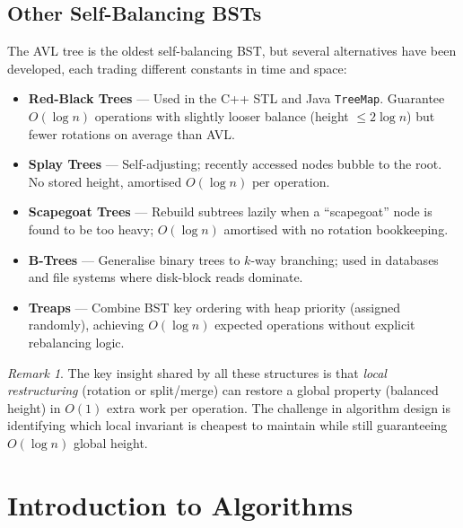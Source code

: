 \documentclass[11pt, a4paper, notitlepage]{report}
\theoremstyle{definition}
\theoremstyle{remark}
\newtheorem{remark}[theorem]{Remark}
\theoremstyle{definition}
\begin{document}
\section{Other Self-Balancing BSTs}
\label{sec:other-balanced-bsts}

The AVL tree is the oldest self-balancing BST, but several alternatives have been developed,
each trading different constants in time and space:

\begin{itemize}
  \item \textbf{Red-Black Trees} --- Used in the C++ STL and Java \texttt{TreeMap}.
        Guarantee $O(\log n)$ operations with slightly looser balance (height $\leq 2\log n$)
        but fewer rotations on average than AVL.
  \item \textbf{Splay Trees} --- Self-adjusting; recently accessed nodes bubble to the root.
        No stored height, amortised $O(\log n)$ per operation.
  \item \textbf{Scapegoat Trees} --- Rebuild subtrees lazily when a ``scapegoat'' node is
        found to be too heavy; $O(\log n)$ amortised with no rotation bookkeeping.
  \item \textbf{B-Trees} --- Generalise binary trees to $k$-way branching; used in
        databases and file systems where disk-block reads dominate.
  \item \textbf{Treaps} --- Combine BST key ordering with heap priority (assigned randomly),
        achieving $O(\log n)$ expected operations without explicit rebalancing logic.
\end{itemize}

\begin{remark}
The key insight shared by all these structures is that \emph{local restructuring} (rotation
or split/merge) can restore a global property (balanced height) in $O(1)$ extra work per
operation.  The challenge in algorithm design is identifying which local invariant is cheapest
to maintain while still guaranteeing $O(\log n)$ global height.
\end{remark}

\chapter{Introduction to Algorithms}
\label{ch:intro-algorithms}
\end{document}

